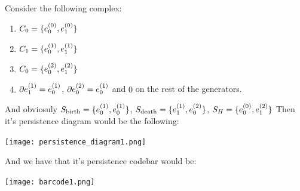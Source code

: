 \begin{example}


%
%
%
%
%


Consider the following complex:

\begin{enumerate}

\item $C_0 = \{e_{0}^{(0)},e_{1}^{(0)}\}$

\item $C_1 = \{e_{0}^{(1)},e_{1}^{(1)}\}$

\item $C_0 = \{e_{0}^{(2)},e_{1}^{(2)}\}$

\item $\partial e_{1}^{(1)}=e_{0}^{(1)}$, $\partial e_{0}^{(2)}=e_{0}^{(1)}$ and 
$0$ on the rest of the generators.
\end{enumerate}

And obviosuly $S_{\text{birth}}=\{
e_{0}^{(1)},
e_{0}^{(1)}
\}$,
$S_{\text{death}}=\{
e_{1}^{(1)},
e_{0}^{(2)}
\}$,
$
S_H=\{
e_{0}^{(0)},
e_{1}^{(2)}
\}
$
Then it's persistence diagram would be the following:

\begin{center}
\texttt{[image: persistence\_diagram1.png]}
\end{center}

And we have that it's persistence codebar would be:


\begin{center}
\texttt{[image: barcode1.png]}
\end{center}


\end{example}






